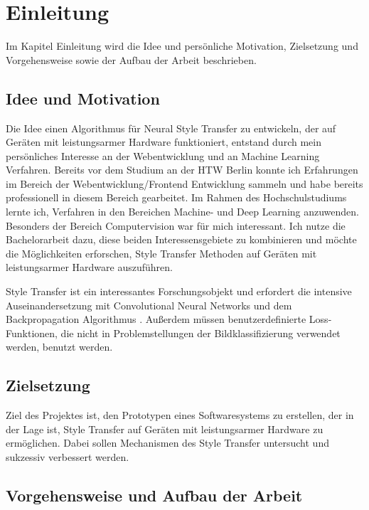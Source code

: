 \chapter{Einleitung}

Im Kapitel Einleitung wird die Idee und persönliche Motivation, Zielsetzung und Vorgehensweise sowie der Aufbau der Arbeit beschrieben.

\section{Idee und Motivation}

Die Idee einen Algorithmus für Neural Style Transfer zu entwickeln, der auf Geräten mit leistungsarmer Hardware funktioniert, entstand durch mein persönliches Interesse an der Webentwicklung und an Machine Learning Verfahren. Bereits vor dem Studium an der HTW Berlin konnte ich Erfahrungen im Bereich der Webentwicklung/Frontend Entwicklung sammeln und habe bereits professionell in diesem Bereich gearbeitet. Im Rahmen des Hochschulstudiums lernte ich, Verfahren in den Bereichen Machine- und Deep Learning anzuwenden. Besonders der Bereich Computervision war für mich interessant. Ich nutze die Bachelorarbeit dazu, diese beiden Interessensgebiete zu kombinieren und möchte die Möglichkeiten erforschen, Style Transfer Methoden auf Geräten mit leistungsarmer Hardware auszuführen.

Style Transfer ist ein interessantes Forschungsobjekt und erfordert die intensive Auseinandersetzung mit Convolutional Neural Networks \cite{lecun-gradientbased-learning-applied-1998} und dem Backpropagation Algorithmus \cite{doi:10.1162/neco.1989.1.4.541}. Außerdem müssen benutzerdefinierte Loss-Funktionen, die nicht in Problemstellungen der Bildklassifizierung verwendet werden, benutzt werden.

\section{Zielsetzung}

Ziel des Projektes ist, den Prototypen eines Softwaresystems zu erstellen, der in der Lage ist, Style Transfer auf Geräten mit leistungsarmer Hardware zu ermöglichen. Dabei sollen Mechanismen des Style Transfer untersucht und sukzessiv verbessert werden.

\section{Vorgehensweise und Aufbau der Arbeit}

